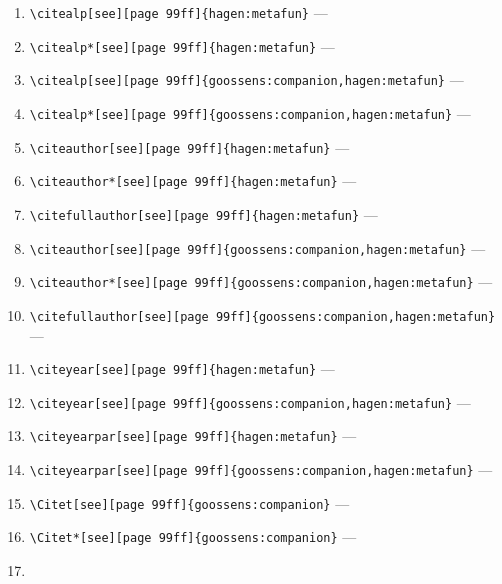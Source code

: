 \documentclass[12pt]{article}
\begin{document}
\begin{enumerate}
\item
\verb|\citealp[see][page 99ff]{hagen:metafun}| --- 
\citealp[see][page 99ff]{hagen:metafun}
\item
\verb|\citealp*[see][page 99ff]{hagen:metafun}| --- 
\citealp*[see][page 99ff]{hagen:metafun}
\item
\verb|\citealp[see][page 99ff]{goossens:companion,hagen:metafun}| --- 
\citealp[see][page 99ff]{goossens:companion,hagen:metafun}
\item
\verb|\citealp*[see][page 99ff]{goossens:companion,hagen:metafun}| --- 
\citealp*[see][page 99ff]{goossens:companion,hagen:metafun}
\item
\verb|\citeauthor[see][page 99ff]{hagen:metafun}| --- 
\citeauthor[see][page 99ff]{hagen:metafun}
\item
\verb|\citeauthor*[see][page 99ff]{hagen:metafun}| --- 
\citeauthor*[see][page 99ff]{hagen:metafun}
\item
\verb|\citefullauthor[see][page 99ff]{hagen:metafun}| --- 
\item
\verb|\citeauthor[see][page 99ff]{goossens:companion,hagen:metafun}| --- 
\citeauthor[see][page 99ff]{goossens:companion,hagen:metafun}
\item
\verb|\citeauthor*[see][page 99ff]{goossens:companion,hagen:metafun}| --- 
\citeauthor*[see][page 99ff]{goossens:companion,hagen:metafun}
\item
\verb|\citefullauthor[see][page 99ff]{goossens:companion,hagen:metafun}| --- 
\item
\verb|\citeyear[see][page 99ff]{hagen:metafun}| --- 
\citeyear[see][page 99ff]{hagen:metafun}
\item
\verb|\citeyear[see][page 99ff]{goossens:companion,hagen:metafun}| --- 
\citeyear[see][page 99ff]{goossens:companion,hagen:metafun}
\item
\verb|\citeyearpar[see][page 99ff]{hagen:metafun}| --- 
\citeyearpar[see][page 99ff]{hagen:metafun}
\item
\verb|\citeyearpar[see][page 99ff]{goossens:companion,hagen:metafun}| --- 
\citeyearpar[see][page 99ff]{goossens:companion,hagen:metafun}
\item
\verb|\Citet[see][page 99ff]{goossens:companion}| --- 
\item
\verb|\Citet*[see][page 99ff]{goossens:companion}| --- 
\item

\end{enumerate}
\end{document}
